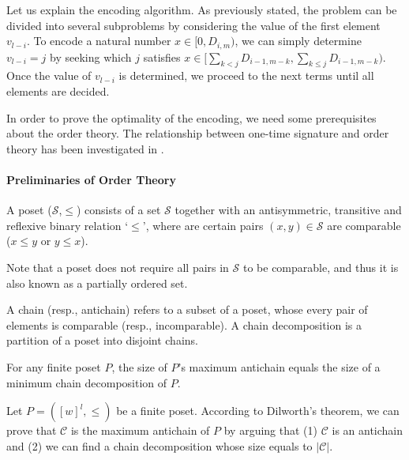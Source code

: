 Let us explain the encoding algorithm. As previously stated, the problem can be divided into several subproblems by considering the value of the first element $v_{l-i}$. To encode a natural number $x\in [0,D_{i,m})$, we can simply determine $v_{l-i}=j$ by seeking which $j$ satisfies $x\in [\sum_{k<j}D_{i-1,m-k},\sum_{k\leq j}D_{i-1,m-k})$. Once the value of $v_{l-i}$ is determined, we proceed to the next terms until all elements are decided.

In order to prove the optimality of the encoding,  we need some prerequisites about the order theory. The relationship between one-time signature and order theory has been investigated in \cite{C:BleMau94}.

\paragraph{Preliminaries of Order Theory} 

\begin{definition}[Poset]
A poset ($\mathcal{S}$,$\leq$) consists of a set $\mathcal{S}$ together with an antisymmetric, transitive and reflexive binary relation `$\leq$', where are certain pairs $(x,y)\in\mathcal{S}$ are comparable ($x\leq y$ or $y\leq x$).
\end{definition}
Note that a poset does not require all pairs in $\mathcal{S}$ to be comparable, and thus it is also known as a partially ordered set. 

\begin{definition}
A chain (resp., antichain) refers to a subset of a poset, whose every pair of elements is comparable (resp., incomparable). A chain decomposition is a partition of a poset into disjoint chains.
\end{definition}


\begin{theorem}
     For any finite poset $P$,  the size of $P$'s maximum antichain equals the size of a minimum chain decomposition of  $P$.
\end{theorem}


Let $P=([w]^l,\leq )$ be a finite poset. According to Dilworth's theorem, we can prove that $\mathcal{C}$ is the maximum antichain of $P$ by arguing that (1) $\mathcal{C}$ is an antichain and (2) we can find a chain decomposition whose size equals to $|\mathcal{C}|$. 


